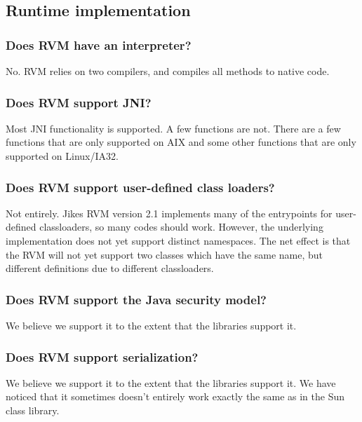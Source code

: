 \subsection{Runtime implementation}

\subsubsection{Does RVM have an interpreter?}

No.  RVM relies on two compilers, and compiles all methods to native code.

\subsubsection{Does RVM support JNI?}

Most JNI functionality is supported. A few functions are not. 
There are a few functions that are only supported on AIX\AIXTMFootnote
and some other functions that are only supported on Linux/IA32.

\subsubsection{Does RVM support user-defined class loaders?}

Not entirely.  Jikes RVM version 2.1 implements many of the entrypoints
for user-defined classloaders, so many codes should work.  However, the
underlying implementation does not yet support distinct namespaces.  The
net effect is that the RVM will not yet support two classes which have the
same name, but different definitions due to different classloaders.

\subsubsection{Does RVM support the Java security model?} 

We believe we support it to the extent that the 
libraries support it.

\subsubsection{Does RVM support serialization?}

We believe we support it to the extent that the 
libraries support it. We have noticed that it sometimes doesn't
entirely work exactly the same as in the Sun class library.

